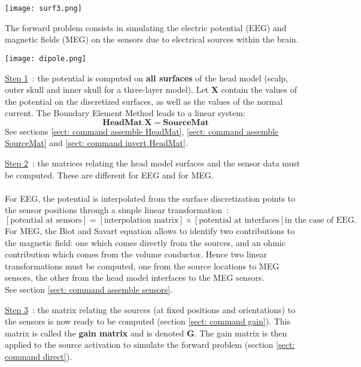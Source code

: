 \centerline{\texttt{[image: surf3.png]}}

\noindent
The forward problem consists in simulating the electric potential (EEG) and magnetic fields (MEG) on the sensors due to electrical sources within the brain.

\centerline{\texttt{[image: dipole.png]}}

\noindent
\underline{Step 1}~: the potential is computed on \textbf{all surfaces } of the head model (scalp, outer skull and inner skull for a three-layer model).  Let $\mathbf{X}$ contain the values of the potential on the discretized surfaces, as well as the values of the normal current. The Boundary Element Method leads to a linear system:
\[
    \mathbf{HeadMat} . \mathbf{X} = \mathbf{SourceMat}
\]
See sections \ref{sect: command assemble HeadMat}, \ref{sect: command assemble SourceMat} and \ref{sect: command invert HeadMat}.

\medskip

\noindent
\underline{Step 2}~: the matrices relating the head model surfaces and the sensor data must be computed. These are different for EEG and for MEG.\\
\\
For EEG, the potential is interpolated from the surface discretization points to the sensor positions through a simple linear transformation~:\\
\[
    \left[ \mbox{potential at sensors} \right] =
    \left[ \mbox{interpolation matrix} \right] \times \left[ \mbox{potential at interfaces} \right] \mbox{in the case of EEG.}
\]
For MEG, the Biot and Savart equation allows to identify two contributions to the magnetic field: one which comes directly from the sources, and an ohmic contribution which comes from the volume conductor. 
Hence two linear transformations must be computed, one from the source locations  to MEG sensors, the other from the head model interfaces to the MEG sensors.\\

\noindent
See section \ref{sect: command assemble sensors}.

 
\medskip

\noindent
\underline{Step 3}~: the matrix relating the sources (at fixed positions and orientations) to the sensors is now ready to be computed (section \ref{sect: command gain}). This matrix is called  the \textbf{gain matrix} and is denoted  $\mathbf{G}$. The gain matrix is then applied to the source activation to simulate the forward problem  (section
\ref{sect: command direct}).
